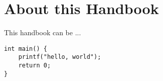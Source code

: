 \section{About this Handbook}

This handbook can be ...

\begin{verbatim}
int main() {
	printf("hello, world");
	return 0;
}
\end{verbatim}
